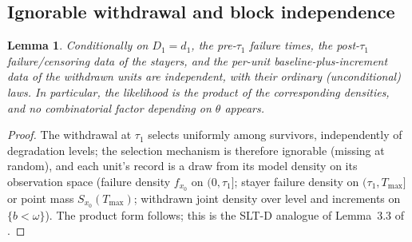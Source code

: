 \documentclass[11pt]{article}
\newtheorem{lemma}{Lemma}
\newcommand{\tmax}{T_{\max}}
\newcommand{\SLTD}{SLT-D}
\begin{document}
\subsection{Ignorable withdrawal and block independence}

\begin{lemma}\label{lem:block}
Conditionally on $D_1=d_1$, the pre-$\tau_1$ failure times, the post-$\tau_1$ failure/censoring
data of the stayers, and the per-unit baseline-plus-increment data of the withdrawn units are
independent, with their ordinary (unconditional) laws. In particular, the likelihood is the
product of the corresponding densities, and no combinatorial factor depending on $\theta$
appears.
\end{lemma}

\begin{proof}
The withdrawal at $\tau_1$ selects uniformly among survivors, independently of degradation
levels; the selection mechanism is therefore ignorable (missing at random), and each unit's
record is a draw from its model density on its observation space (failure density $f_{x_0}$ on
$(0,\tau_1]$; stayer failure density on $(\tau_1,\tmax]$ or point mass $S_{x_0}(\tmax)$;
withdrawn joint density over level and increments on $\{b<\omega\}$). The product form follows;
this is the \SLTD{} analogue of Lemma~3.3 of \citet{LaumenCramer2019}.
\end{proof}
\end{document}
